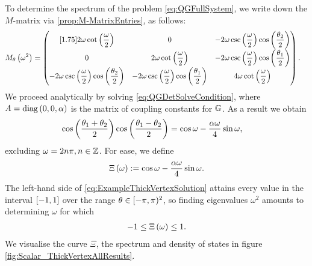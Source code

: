 To determine the spectrum of the problem \eqref{eq:QGFullSystem}, we write down the $M$-matrix via \ref{prop:M-MatrixEntries}, as follows:
\begin{align*}
	M_{\theta}\left( \omega^2 \right) &=
	\begin{pmatrix}[1.75]
		2\omega\cot\left( \dfrac{\omega}{2} \right) & 0 & -2\omega\csc\left( \dfrac{\omega}{2} \right)\cos\left( \dfrac{\theta_2}{2} \right) \\
		0 & 2\omega\cot\left( \dfrac{\omega}{2} \right) & -2\omega\csc\left( \dfrac{\omega}{2} \right)\cos\left( \dfrac{\theta_1}{2} \right) \\
		-2\omega\csc\left( \dfrac{\omega}{2} \right)\cos\left( \dfrac{\theta_2}{2} \right) & -2\omega\csc\left( \dfrac{\omega}{2} \right)\cos\left( \dfrac{\theta_1}{2} \right) & 4\omega\cot\left( \dfrac{\omega}{2} \right)
	\end{pmatrix}.
\end{align*}
We proceed analytically by solving \eqref{eq:QGDetSolveCondition}, where $A=\mathrm{diag}\left( 0,0,\alpha \right)$ is the matrix of coupling constants for $\mathbb{G}$.
As a result we obtain
\begin{align} \label{eq:ExampleThickVertexSolution}
	\cos\left( \frac{\theta_1+\theta_2}{2} \right)\cos\left( \frac{\theta_1-\theta_2}{2} \right) &= \cos\omega - \frac{\alpha\omega}{4}\sin\omega, 
\end{align}
excluding $\omega=2n\pi, n\in\mathbb{Z}$.
For ease, we define
\begin{align*}
	\Xi\left( \omega \right) := \cos\omega - \frac{\alpha\omega}{4}\sin\omega.
\end{align*}
The left-hand side of \eqref{eq:ExampleThickVertexSolution} attains every value in the interval $\left[ -1,1 \right]$ over the range $\theta\in[-\pi,\pi)^2$, so finding eigenvalues $\omega^2$ amounts to determining $\omega$ for which
\begin{align} \label{eq:ExampleThickVertexDispExpr}
	-1 \leq \Xi\left( \omega \right) \leq 1.
\end{align}
We visualise the curve $\Xi$, the spectrum and density of states in figure \ref{fig:Scalar_ThickVertexAllResults}.
